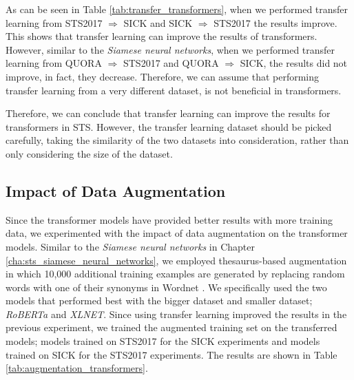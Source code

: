 As can be seen in Table \ref{tab:transfer_transformers}, when we performed transfer learning from STS2017 $\Rightarrow$ SICK and SICK $\Rightarrow$ STS2017 the results improve. This shows that transfer learning can improve the results of transformers. However, similar to the \textit{Siamese neural networks}, when we performed transfer learning from QUORA $\Rightarrow$ STS2017 and QUORA $\Rightarrow$ SICK, the results did not improve, in fact, they decrease. Therefore, we can assume that performing transfer learning from a very different dataset, is not beneficial in transformers. 

Therefore, we can conclude that transfer learning can improve the results for transformers in STS. However, the transfer learning dataset should be picked carefully, taking the similarity of the two datasets into consideration, rather than only considering the size of the dataset.


\subsection{Impact of Data Augmentation}
\label{sec:transformer_aug}
Since the transformer models have provided better results with more training data, we experimented with the impact of data augmentation on the transformer models. Similar to the \textit{Siamese neural networks} in Chapter \ref{cha:sts_siamese_neural_networks}, we employed thesaurus-based augmentation in which 10,000 additional training examples are generated by replacing random words with one of their synonyms in Wordnet \autocite{10.1145/219717.219748}. We specifically used the two models that performed best with the bigger dataset and smaller dataset; \textit{RoBERTa} and \textit{XLNET}. Since using transfer learning improved the results in the previous experiment, we trained the augmented training set on the transferred models; models trained on STS2017 for the SICK experiments and models trained on SICK for the STS2017 experiments. The results are shown in Table \ref{tab:augmentation_transformers}. 

